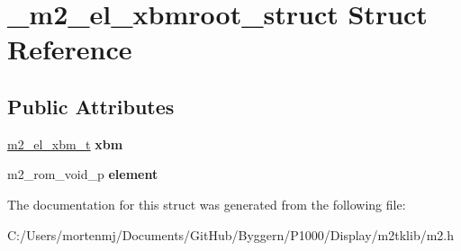 \hypertarget{struct__m2__el__xbmroot__struct}{\section{\-\_\-m2\-\_\-el\-\_\-xbmroot\-\_\-struct Struct Reference}
\label{struct__m2__el__xbmroot__struct}
}
\subsection*{Public Attributes}
\begin{DoxyCompactItemize}
\item 
\hypertarget{struct__m2__el__xbmroot__struct_a7264ca211bfa0e67ffb5b967ff644f42}{\hyperlink{struct__m2__el__xbm__struct}{m2\-\_\-el\-\_\-xbm\-\_\-t} {\bfseries xbm}}\label{struct__m2__el__xbmroot__struct_a7264ca211bfa0e67ffb5b967ff644f42}

\item 
\hypertarget{struct__m2__el__xbmroot__struct_ab1bf4d4a2c35afea46059dd8060bdf11}{m2\-\_\-rom\-\_\-void\-\_\-p {\bfseries element}}\label{struct__m2__el__xbmroot__struct_ab1bf4d4a2c35afea46059dd8060bdf11}

\end{DoxyCompactItemize}


The documentation for this struct was generated from the following file\-:\begin{DoxyCompactItemize}
\item 
C\-:/\-Users/mortenmj/\-Documents/\-Git\-Hub/\-Byggern/\-P1000/\-Display/m2tklib/m2.\-h\end{DoxyCompactItemize}

